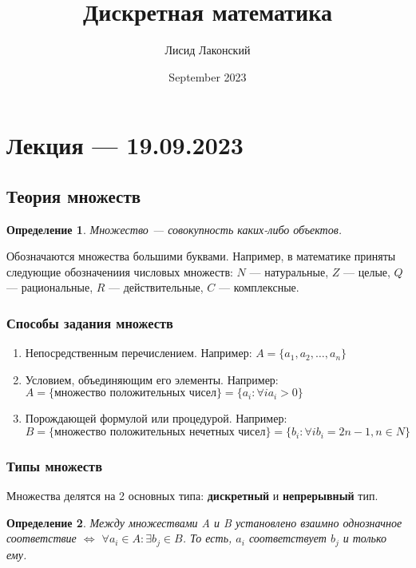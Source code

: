 \documentclass{article}
\title{Дискретная математика}
\author{Лисид Лаконский}
\date{September 2023}
\newtheorem{definition}{Определение}
\begin{document}
\raggedright

\maketitle

\tableofcontents
\pagebreak

\section{Лекция — 19.09.2023}

\subsection{Теория множеств}

\begin{definition}
    Множество — совокупность каких-либо объектов.
\end{definition}

Обозначаются множества большими буквами. Например, в математике приняты следующие обозначениия числовых множеств: $N$ — натуральные, $Z$ — целые, $Q$ — рациональные, $R$ — действительные, $C$ — комплексные.

\subsubsection{Способы задания множеств}

\begin{enumerate}
    \item Непосредственным перечислением. Например: $A = \{ a_{1}, a_{2}, \dots, a_{n} \}$
    \item Условием, объединяющим его элементы. Например: $A = \{ \text{множество положительных чисел} \} = \{ a_{i}: \forall i a_{i} > 0 \}$
    \item Порождающей формулой или процедурой. Например: $B = \{ \text{множество положительных нечетных чисел} \} = \{ b_{i}: \forall i b_{i} = 2n-1, n \in N \}$
\end{enumerate}


\subsubsection{Типы множеств}

Множества делятся на 2 основных типа: \textbf{дискретный} и \textbf{непрерывный} тип.

\begin{definition}
    Между множествами A и B установлено взаимно однозначное соответствие $\Leftrightarrow$ $\forall a_i \in A: \exists b_{j} \in B$. То есть, $a_{i}$ соответствует $b_{j}$ и только ему.
\end{definition}
\end{document}
